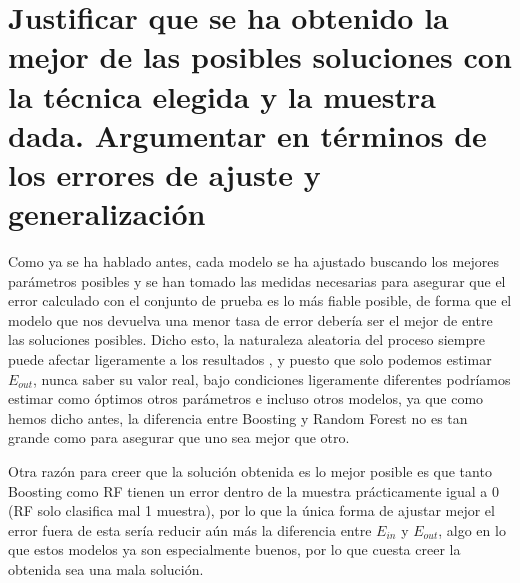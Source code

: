 \documentclass{article}
\begin{document}
	\section{Justificar que se ha obtenido la mejor de las posibles soluciones con la técnica elegida y la muestra dada. Argumentar en términos de los errores de ajuste y generalización} %
	Como ya se ha hablado antes, cada modelo se ha ajustado buscando los mejores parámetros posibles y se han tomado las medidas necesarias para asegurar que el error calculado con el conjunto de prueba es lo más fiable posible, de forma que el modelo que nos devuelva una menor tasa de error debería ser el mejor de entre las soluciones posibles. Dicho esto, la naturaleza aleatoria del proceso siempre puede afectar ligeramente a los resultados , y puesto que solo podemos estimar $E_{out}$, nunca saber su valor real, bajo condiciones ligeramente diferentes podríamos estimar como óptimos otros parámetros e incluso otros modelos, ya que como hemos dicho antes, la diferencia entre Boosting y Random Forest no es tan grande como para asegurar que uno sea mejor que otro.
	\par 
	Otra razón para creer que la solución obtenida es lo mejor posible es que tanto Boosting como RF tienen un error dentro de la muestra prácticamente igual a 0 (RF solo clasifica mal 1 muestra), por lo que la única forma de ajustar mejor el error fuera de esta sería reducir aún más la diferencia entre $E_{in}$ y $E_{out}$, algo en lo que estos modelos ya son especialmente buenos, por lo que cuesta creer la obtenida sea una mala solución.
	
	
\end{document}
